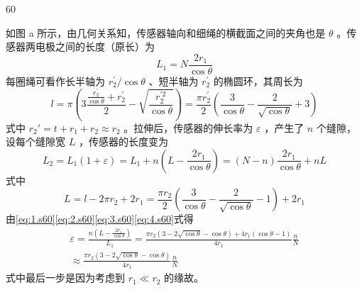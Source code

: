 \begin{solution}{60}
    \begin{subsolution}
        如图 a 所示，由几何关系知，传感器轴向和细绳的横截面之间的夹角也是 $\theta$ 。传感器两电极之间的长度（原长）为
        \begin{equation}
            L _ {1} = N \frac {2 r _ {1}}{\cos \theta}
            \label{eq:1.s60}
        \end{equation}
        每圈绳可看作长半轴为 $r_{2}^{\prime}/\cos\theta$ 、短半轴为 $r_{2}^{\prime}$ 的椭圆环，其周长为
        \begin{equation}
            l = \pi \left(3 \frac {\frac {r _ {2}^{\prime}}{\cos \theta} + r _ {2}^{\prime}}{2} - \sqrt {\frac {r _ {2}^{\prime 2}}{\cos \theta}}\right) = \frac {\pi r _ {2}^{\prime}}{2} \left(\frac {3}{\cos \theta} - \frac {2}{\sqrt {\cos \theta}} + 3\right)
            \label{eq:2.s60}
        \end{equation}
        式中 $r_2' = t + r_1 + r_2 \approx r_2$ 。拉伸后，传感器的伸长率为 $\varepsilon$ ，产生了 $n$ 个缝隙，设每个缝隙宽 $L$ ，传感器的长度变为
        \begin{equation}
            L _ {2} = L _ {1} (1 + \varepsilon) = L _ {1} + n \left(L - \frac {2 r _ {1}}{\cos \theta}\right) = (N - n) \frac {2 r _ {1}}{\cos \theta} + n L
            \label{eq:3.s60}
        \end{equation}
        式中
        \begin{equation}
            L = l - 2 \pi r _ {2} + 2 r _ {1} = \frac {\pi r _ {2}}{2} \left(\frac {3}{\cos \theta} - \frac {2}{\sqrt {\cos \theta}} - 1\right) + 2 r _ {1}
            \label{eq:4.s60}
        \end{equation}
        由\eqref{eq:1.s60}\eqref{eq:2.s60}\eqref{eq:3.s60}\eqref{eq:4.s60}式得
        \begin{equation}
            \begin{array}{l}
                \varepsilon = \frac {n (L - \frac {2 r _ {1}}{\cos \theta})}{L _ {1}} = \frac {\pi r _ {2} (3 - 2 \sqrt {\cos \theta} - \cos \theta) + 4 r _ {1} (\cos \theta - 1)}{4 r _ {1}} \frac {n}{N} \\
                \approx \frac {\pi r _ {2} (3 - 2 \sqrt {\cos \theta} - \cos \theta)}{4 r _ {1}} \frac {n}{N}
            \end{array}
            \label{eq:5.s60}
        \end{equation}
        式中最后一步是因为考虑到 $r_1 \ll r_2$ 的缘故。


\end{subsolution}
\end{solution}
